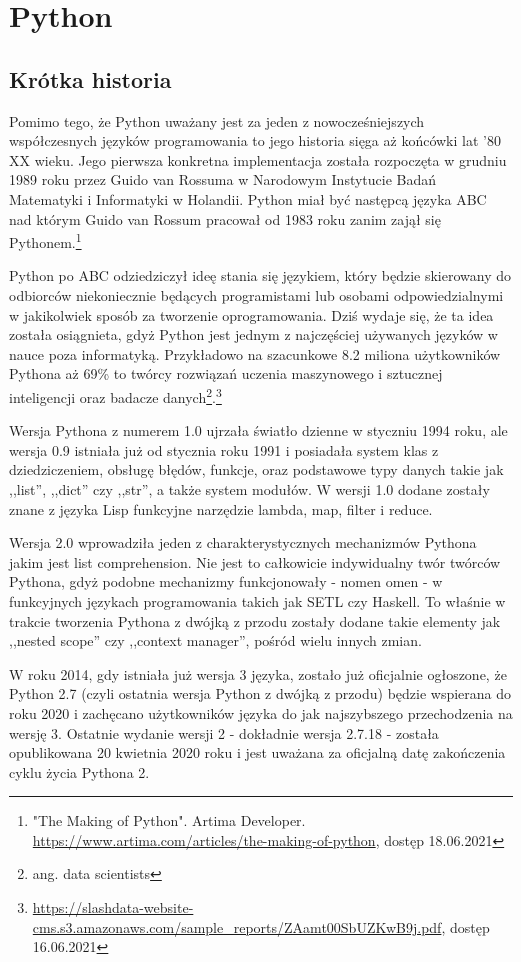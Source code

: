 \chapter{Python}

\section{Krótka historia}
Pomimo tego, że Python uważany jest za jeden z nowocześniejszych współczesnych języków programowania to jego historia sięga aż końcówki lat '80 XX wieku. Jego pierwsza konkretna implementacja została rozpoczęta w grudniu 1989 roku przez Guido van Rossuma w Narodowym Instytucie Badań Matematyki i Informatyki w Holandii. Python miał być następcą języka ABC nad którym Guido van Rossum pracował od 1983 roku zanim zajął się Pythonem.\footnote{ "The Making of Python". Artima Developer. \url{https://www.artima.com/articles/the-making-of-python}, dostęp 18.06.2021}

Python po ABC odziedziczył ideę stania się językiem, który będzie skierowany do odbiorców niekoniecznie będących programistami lub osobami odpowiedzialnymi w jakikolwiek sposób za tworzenie oprogramowania. Dziś wydaje się, że ta idea została osiągnieta, gdyż Python jest jednym z najczęściej używanych języków w nauce poza informatyką. Przykładowo na szacunkowe 8.2 miliona użytkowników Pythona aż 69\% to twórcy rozwiązań uczenia maszynowego i sztucznej inteligencji oraz badacze danych\footnote{ang. data scientists}.\footnote{\url{https://slashdata-website-cms.s3.amazonaws.com/sample_reports/ZAamt00SbUZKwB9j.pdf}, dostęp 16.06.2021}

Wersja Pythona z numerem 1.0 ujrzała światło dzienne w styczniu 1994 roku, ale wersja 0.9 istniała już od stycznia roku 1991 i posiadała system klas z dziedziczeniem, obsługę błędów, funkcje, oraz podstawowe typy danych takie jak ,,list'', ,,dict'' czy ,,str'', a także system modułów. W wersji 1.0 dodane zostały znane z języka Lisp funkcyjne narzędzie lambda, map, filter i reduce.

Wersja 2.0 wprowadziła jeden z charakterystycznych mechanizmów Pythona jakim jest list comprehension. Nie jest to całkowicie indywidualny twór twórców Pythona, gdyż podobne mechanizmy funkcjonowały - nomen omen - w funkcyjnych językach programowania takich jak SETL czy Haskell. To właśnie w trakcie tworzenia Pythona z dwójką z przodu zostały dodane takie elementy jak ,,nested scope'' czy ,,context manager'', pośród wielu innych zmian.

W roku 2014, gdy istniała już wersja 3 języka, zostało już oficjalnie ogłoszone, że Python 2.7 (czyli ostatnia wersja Python z dwójką z przodu) będzie wspierana do roku 2020 i zachęcano użytkowników języka do jak najszybszego przechodzenia na wersję 3. Ostatnie wydanie wersji 2 - dokładnie wersja 2.7.18 - została opublikowana 20 kwietnia 2020 roku i jest uważana za oficjalną datę zakończenia cyklu życia Pythona 2.

